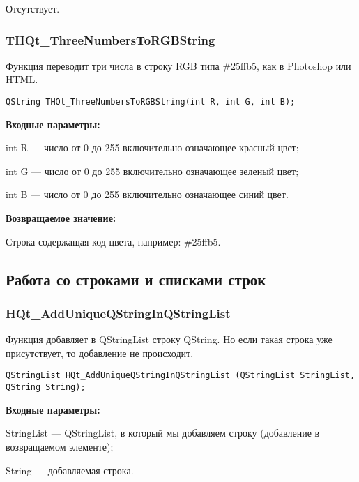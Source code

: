 \documentclass[a4paper,12pt]{article}
\begin{document}
Отсутствует.


\subsubsection{THQt\_ThreeNumbersToRGBString}\label{THQt_ThreeNumbersToRGBString}

Функция переводит три числа в строку RGB типа \#25ffb5, как в Photoshop или HTML.


\begin{lstlisting}[label=code_syntax_THQt_ThreeNumbersToRGBString,caption=Синтаксис]
QString THQt_ThreeNumbersToRGBString(int R, int G, int B);
\end{lstlisting}

\textbf{Входные параметры:}

int R --- число от 0 до 255 включительно означающее красный цвет;
 
    int G --- число от 0 до 255 включительно означающее зеленый цвет;
 
    int B --- число от 0 до 255 включительно означающее синий цвет.

\textbf{Возвращаемое значение:}

Строка содержащая код цвета, например: \#25ffb5.


\subsection{Работа со строками и списками строк}

\subsubsection{HQt\_AddUniqueQStringInQStringList}\label{HQt_AddUniqueQStringInQStringList}

Функция добавляет в QStringList строку QString. Но если такая строка уже присутствует, то добавление не происходит.


\begin{lstlisting}[label=code_syntax_HQt_AddUniqueQStringInQStringList,caption=Синтаксис]
QStringList HQt_AddUniqueQStringInQStringList (QStringList StringList, QString String);
\end{lstlisting}

\textbf{Входные параметры:}
 
StringList --- QStringList, в который мы добавляем строку (добавление в возвращаемом элементе);

     String --- добавляемая строка.
\end{document}

